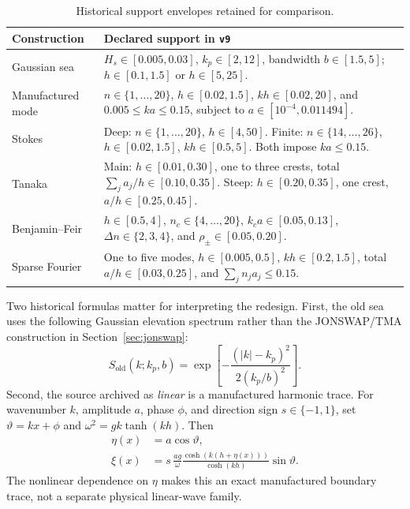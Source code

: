 \documentclass[11pt]{article}
\begin{document}
\begin{table}[ht]
  \centering
  \caption{Historical support envelopes retained for comparison.}
  \label{tab:v9-supports}
  \small
  \begin{tabularx}{\textwidth}{
    @{}>{\raggedright\arraybackslash}p{}
       >{\raggedright\arraybackslash}X@{}}
    \toprule
    Construction & Declared support in \texttt{v9} \\
    \midrule
    Gaussian sea
      & $H_s\in[0.005,0.03]$, $k_p\in[2,12]$, bandwidth
        $b\in[1.5,5]$; $h\in[0.1,1.5]$ or $h\in[5,25]$. \\
    Manufactured mode
      & $n\in\{1,\ldots,20\}$, $h\in[0.02,1.5]$,
        $kh\in[0.02,20]$, and $0.005\leq ka\leq0.15$, subject to
        $a\in[10^{-4},0.011494]$. \\
    Stokes
      & Deep: $n\in\{1,\ldots,20\}$, $h\in[4,50]$.
        Finite: $n\in\{14,\ldots,26\}$, $h\in[0.02,1.5]$,
        $kh\in[0.5,5]$.  Both impose $ka\leq0.15$. \\
    Tanaka
      & Main: $h\in[0.01,0.30]$, one to three crests, total
        $\sum_j a_j/h\in[0.10,0.35]$.  Steep: $h\in[0.20,0.35]$,
        one crest, $a/h\in[0.25,0.45]$. \\
    Benjamin--Feir
      & $h\in[0.5,4]$, $n_c\in\{4,\ldots,20\}$,
        $k_ca\in[0.05,0.13]$, $\Delta n\in\{2,3,4\}$, and
        $\rho_\pm\in[0.05,0.20]$. \\
    Sparse Fourier
      & One to five modes, $h\in[0.005,0.5]$,
        $kh\in[0.2,1.5]$, total $a/h\in[0.03,0.25]$, and
        $\sum_j n_ja_j\leq0.15$. \\
    \bottomrule
  \end{tabularx}
\end{table}

Two historical formulas matter for interpreting the redesign.  First, the
old sea uses the following Gaussian elevation spectrum rather than the
JONSWAP/TMA construction in Section~\ref{sec:jonswap}:
\begin{equation}
  S_{\mathrm{old}}(k;k_p,b)
  =\exp\!\left[-\frac{(|k|-k_p)^2}{2(k_p/b)^2}\right].
  \label{eq:old-gaussian-spectrum}
\end{equation}
Second, the source archived as \emph{linear} is a manufactured harmonic
trace.  For wavenumber $k$, amplitude $a$, phase $\phi$, and direction sign
$s\in\{-1,1\}$, set $\vartheta=kx+\phi$ and
$\omega^2=gk\tanh(kh)$.  Then
\begin{align}
  \eta(x)&=a\cos\vartheta,\\
  \xi(x)&=s\,\frac{ag}{\omega}
    \frac{\cosh(k(h+\eta(x)))}{\cosh(kh)}\sin\vartheta.
  \label{eq:old-manufactured-xi}
\end{align}
The nonlinear dependence on $\eta$ makes this an exact manufactured
boundary trace, not a separate physical linear-wave family.
\end{document}
